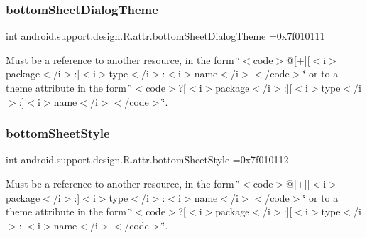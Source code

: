 \subsubsection{\texorpdfstring{bottom\+Sheet\+Dialog\+Theme}{bottomSheetDialogTheme}}
{\footnotesize\ttfamily int android.\+support.\+design.\+R.\+attr.\+bottom\+Sheet\+Dialog\+Theme =0x7f010111\hspace{0.3cm}{\ttfamily [static]}}

Must be a reference to another resource, in the form \char`\"{}$<$code$>$@\mbox{[}+\mbox{]}\mbox{[}$<$i$>$package$<$/i$>$\+:\mbox{]}$<$i$>$type$<$/i$>$\+:$<$i$>$name$<$/i$>$$<$/code$>$\char`\"{} or to a theme attribute in the form \char`\"{}$<$code$>$?\mbox{[}$<$i$>$package$<$/i$>$\+:\mbox{]}\mbox{[}$<$i$>$type$<$/i$>$\+:\mbox{]}$<$i$>$name$<$/i$>$$<$/code$>$\char`\"{}. \mbox{\label{classandroid_1_1support_1_1design_1_1R_1_1attr_a3d3267a3d987f32f59a02f0985be6a5c}} 
\subsubsection{\texorpdfstring{bottom\+Sheet\+Style}{bottomSheetStyle}}
{\footnotesize\ttfamily int android.\+support.\+design.\+R.\+attr.\+bottom\+Sheet\+Style =0x7f010112\hspace{0.3cm}{\ttfamily [static]}}

Must be a reference to another resource, in the form \char`\"{}$<$code$>$@\mbox{[}+\mbox{]}\mbox{[}$<$i$>$package$<$/i$>$\+:\mbox{]}$<$i$>$type$<$/i$>$\+:$<$i$>$name$<$/i$>$$<$/code$>$\char`\"{} or to a theme attribute in the form \char`\"{}$<$code$>$?\mbox{[}$<$i$>$package$<$/i$>$\+:\mbox{]}\mbox{[}$<$i$>$type$<$/i$>$\+:\mbox{]}$<$i$>$name$<$/i$>$$<$/code$>$\char`\"{}. \mbox{\label{classandroid_1_1support_1_1design_1_1R_1_1attr_a209ae9ca1ec9cf4b260524ededf1660c}} 
